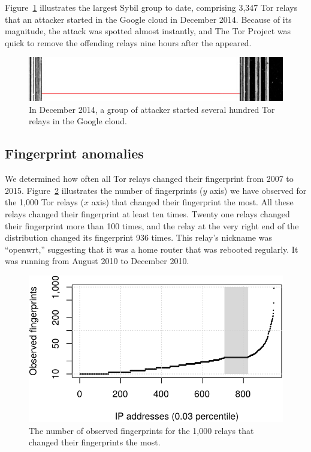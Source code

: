 Figure~\ref{fig:2014-12-lizard} illustrates the largest Sybil group to date,
comprising 3,347 Tor relays that an attacker started in the Google cloud in
December 2014.  Because of its magnitude, the attack was spotted almost
instantly, and The Tor Project was quick to remove the offending relays nine
hours after the appeared.

\begin{figure}[t]
	\centering
	\includegraphics[width=\linewidth]{diagrams/2014-12.jpg}
	\caption{In December 2014, a group of attacker started several hundred Tor
		relays in the Google cloud.}
	\label{fig:2014-12-lizard}
\end{figure}

\subsection{Fingerprint anomalies}
\label{sec:fingerprint-anomalies}
We determined how often all Tor relays changed their fingerprint from 2007 to
2015.  Figure~\ref{fig:fingerprints} illustrates the number of fingerprints ($y$
axis) we have observed for the 1,000 Tor relays ($x$ axis) that changed their
fingerprint the most.  All these relays changed their fingerprint at least ten
times.  Twenty one relays changed their fingerprint more than 100 times, and the
relay at the very right end of the distribution changed its fingerprint 936
times.  This relay's nickname was ``openwrt,'' suggesting that it was a home
router that was rebooted regularly.  It was running from August 2010 to December
2010.

\begin{figure}[t]
	\centering
	\includegraphics[width=0.8\linewidth]{diagrams/fingerprints.pdf}
	\caption{The number of observed fingerprints for the 1,000 relays that
	changed their fingerprints the most.}
	\label{fig:fingerprints}
\end{figure}

